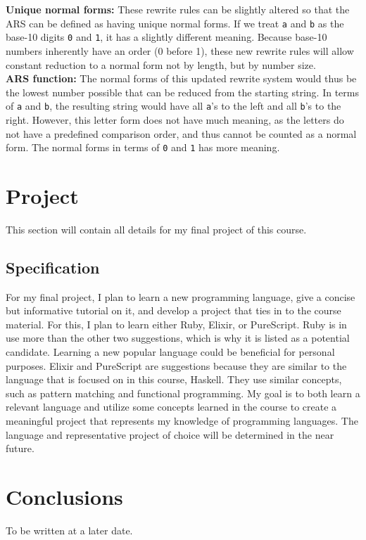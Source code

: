 \documentclass{article}
\theoremstyle{theorem}
\theoremstyle{definition}
\theoremstyle{remark}
\begin{document}
\noindent \textbf{Unique normal forms: } These rewrite rules can be slightly altered so that the ARS can be defined as having unique normal forms. If we treat \texttt{a} and \texttt{b} as the base-10 digits \texttt{0} and \texttt{1}, it has a slightly different meaning. Because base-10 numbers inherently have an order (0 before 1), these new rewrite rules will allow constant reduction to a normal form not by length, but by number size.\\

\noindent \textbf{ARS function: } The normal forms of this updated rewrite system would thus be the lowest number possible that can be reduced from the starting string. In terms of \texttt{a} and \texttt{b}, the resulting string would have all \texttt{a}'s to the left and all \texttt{b}'s to the right. However, this letter form does not have much meaning, as the letters do not have a predefined comparison order, and thus cannot be counted as a normal form. The normal forms in terms of \texttt{0} and \texttt{1} has more meaning.

\section{Project}
This section will contain all details for my final project of this course.
\subsection{Specification}
For my final project, I plan to learn a new programming language, give a concise but informative tutorial on it, and develop a project that ties in to the course material. For this, I plan to learn either Ruby, Elixir, or PureScript. Ruby is in use more than the other two suggestions, which is why it is listed as a potential candidate. Learning a new popular language could be beneficial for personal purposes. Elixir and PureScript are suggestions because they are similar to the language that is focused on in this course, Haskell. They use similar concepts, such as pattern matching and functional programming. My goal is to both learn a relevant language and utilize some concepts learned in the course to create a meaningful project that represents my knowledge of programming languages. The language and representative project of choice will be determined in the near future.


\section{Conclusions}\label{conclusions}

To be written at a later date.
\end{document}
